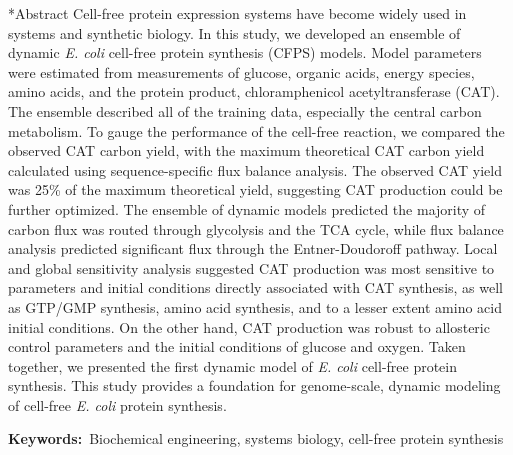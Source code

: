 \documentclass[12pt]{article}
\makeatletter
\renewcommand\section{\@startsection
	{subsection}{2}{0mm}
	{-0.2in}
	{0.05\baselineskip}
	{\normalfont\large\bfseries}}
\makeatother
\begin{document}
\section*{Abstract}
Cell-free protein expression systems have become widely used in systems and synthetic biology.
In this study, we developed an ensemble of dynamic \textit{E. coli} cell-free protein synthesis (CFPS) models.
Model parameters were estimated from measurements of glucose, organic acids, energy species, amino acids, and the protein product, chloramphenicol acetyltransferase (CAT).
The ensemble described all of the training data, especially the central carbon metabolism.
To gauge the performance of the cell-free reaction, we compared the observed CAT carbon yield, with the maximum theoretical CAT carbon yield calculated using sequence-specific flux balance analysis.
The observed CAT yield was 25\% of the maximum theoretical yield, suggesting CAT production could be further optimized.
The ensemble of dynamic models predicted the majority of carbon flux was routed through glycolysis and the TCA cycle, while flux balance analysis predicted significant flux through the Entner-Doudoroff pathway.
Local and global sensitivity analysis suggested CAT production was most sensitive to parameters and initial conditions directly associated with CAT synthesis, as well as GTP/GMP synthesis, amino acid synthesis, and to a lesser extent amino acid initial conditions.
On the other hand, CAT production was robust to allosteric control parameters and the initial conditions of glucose and oxygen.
Taken together, we presented the first dynamic model of \textit{E. coli} cell-free protein synthesis.
This study provides a foundation for genome-scale, dynamic modeling of cell-free \textit{E. coli} protein synthesis.

\vspace{0.1in}
{\noindent \textbf{Keywords:}~Biochemical engineering, systems biology, cell-free protein synthesis}

\pagebreak

\setcounter{page}{1}

\end{document}
